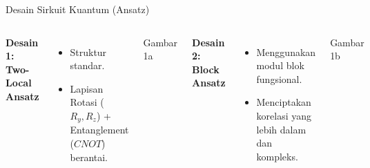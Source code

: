 \documentclass[10pt]{beamer}
\begin{document}
\begin{frame}{Desain Sirkuit Kuantum (Ansatz)}
    \begin{columns}
        \textbf{Desain 1: Two-Local Ansatz}
        \begin{itemize}
            \item Struktur standar.
            \item Lapisan Rotasi ($R_y, R_z$) + Entanglement ($CNOT$) berantai.
        \end{itemize}
        \vspace{1cm}
        \begin{block}{Gambar 1a}
        \end{block}
        
        \textbf{Desain 2: Block Ansatz}
        \begin{itemize}
            \item Menggunakan modul blok fungsional.
            \item Menciptakan korelasi yang lebih dalam dan kompleks.
        \end{itemize}
        \vspace{1cm}
        \begin{block}{Gambar 1b}
        \end{block}
    \end{columns}
\end{frame}

\end{document}

